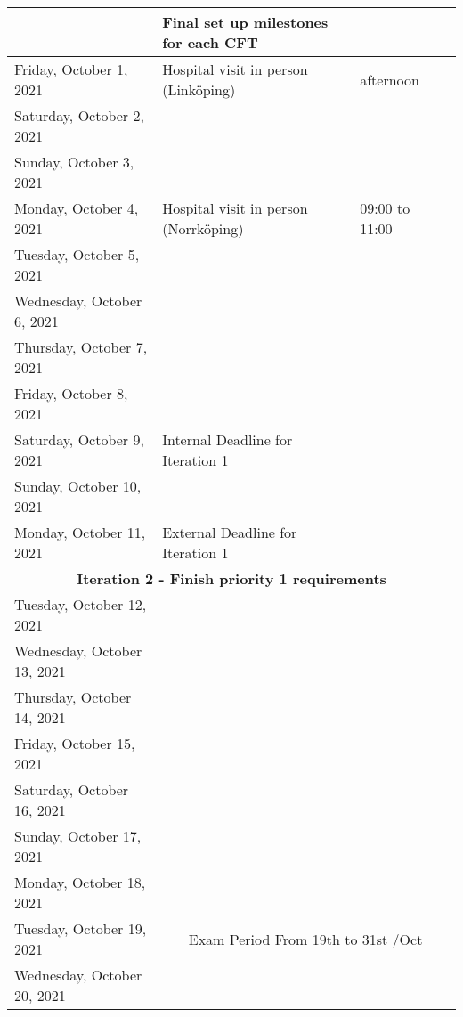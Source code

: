 \begin{adjustbox}{width=1.2\textwidth}
\begin{tabular}{|l|l|l|l|}
\multicolumn{ 1}{|c|}{} & Final set up milestones for each CFT &            &            \\
\hline
Friday, October 1, 2021 & Hospital visit in person (Linköping) &  afternoon &            \\
\hline
Saturday, October 2, 2021 &            &            &            \\
\hline
Sunday, October 3, 2021 &            &            &            \\
\hline
Monday, October 4, 2021 & Hospital visit in person (Norrköping) & 09:00 to 11:00 &            \\
\hline
Tuesday, October 5, 2021 &            &            &            \\
\hline
Wednesday, October 6, 2021 &            &            &            \\
\hline
Thursday, October 7, 2021 &            &            &            \\
\hline
Friday, October 8, 2021 &            &            &            \\
\hline
Saturday, October 9, 2021 & Internal Deadline for Iteration 1 &            &            \\
\hline
Sunday, October 10, 2021 &            &            &            \\
\hline
Monday, October 11, 2021 & External Deadline for Iteration 1 &            &            \\
\hline
\multicolumn{ 4}{|c}{{\bf Iteration 2 - Finish priority 1 requirements}} \\
\hline
Tuesday, October 12, 2021 &            &            &            \\
\hline
Wednesday, October 13, 2021 &            &            &            \\
\hline
Thursday, October 14, 2021 &            &            &            \\
\hline
Friday, October 15, 2021 &            &            &            \\
\hline
Saturday, October 16, 2021 &            &            &            \\
\hline
Sunday, October 17, 2021 &            &            &            \\
\hline
Monday, October 18, 2021 &            &            &            \\
\hline
Tuesday, October 19, 2021 & \multicolumn{ 3}{|c}{Exam Period From 19th to 31st /Oct} \\

Wednesday, October 20, 2021 &               \multicolumn{ 3}{|c}{} \\


\end{tabular}
\end{adjustbox}
